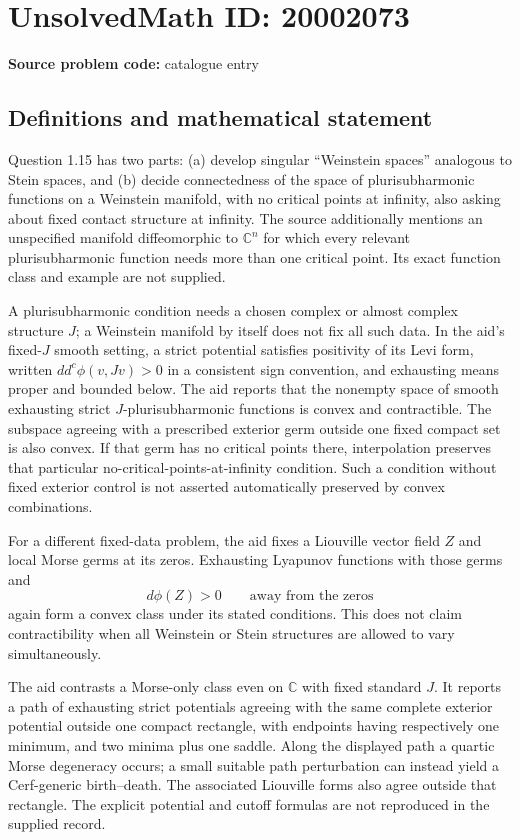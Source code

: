 \documentclass[11pt]{article}
\begin{document}
\section*{UnsolvedMath ID: 20002073}
\textbf{Source problem code:} catalogue entry
\subsection{Definitions and mathematical statement}
Question 1.15 has two parts: (a) develop singular ``Weinstein spaces'' analogous to Stein spaces, and (b) decide connectedness of the space of plurisubharmonic functions on a Weinstein manifold, with no critical points at infinity, also asking about fixed contact structure at infinity. The source additionally mentions an unspecified manifold diffeomorphic to \(\mathbb C^n\) for which every relevant plurisubharmonic function needs more than one critical point. Its exact function class and example are not supplied.

A plurisubharmonic condition needs a chosen complex or almost complex structure \(J\); a Weinstein manifold by itself does not fix all such data. In the aid's fixed-\(J\) smooth setting, a strict potential satisfies positivity of its Levi form, written \(dd^c\phi(v,Jv)>0\) in a consistent sign convention, and exhausting means proper and bounded below. The aid reports that the nonempty space of smooth exhausting strict \(J\)-plurisubharmonic functions is convex and contractible. The subspace agreeing with a prescribed exterior germ outside one fixed compact set is also convex. If that germ has no critical points there, interpolation preserves that particular no-critical-points-at-infinity condition. Such a condition without fixed exterior control is not asserted automatically preserved by convex combinations.

For a different fixed-data problem, the aid fixes a Liouville vector field \(Z\) and local Morse germs at its zeros. Exhausting Lyapunov functions with those germs and
\[
 d\phi(Z)>0\qquad\text{away from the zeros}
\]
again form a convex class under its stated conditions. This does not claim contractibility when all Weinstein or Stein structures are allowed to vary simultaneously.

The aid contrasts a Morse-only class even on \(\mathbb C\) with fixed standard \(J\). It reports a path of exhausting strict potentials agreeing with the same complete exterior potential outside one compact rectangle, with endpoints having respectively one minimum, and two minima plus one saddle. Along the displayed path a quartic Morse degeneracy occurs; a small suitable path perturbation can instead yield a Cerf-generic birth--death. The associated Liouville forms also agree outside that rectangle. The explicit potential and cutoff formulas are not reproduced in the supplied record.
\end{document}
